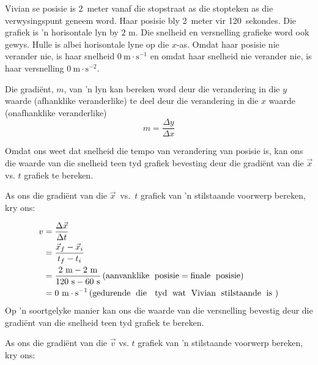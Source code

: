 Vivian se posisie is 2~meter vanaf die stopstraat as die stopteken as die verwysingspunt geneem word. Haar posisie bly 2~meter vir 120~sekondes. Die grafiek is  'n horisontale lyn by $2 \text{ m}$. Die snelheid en versnelling grafieke word ook gewys. Hulle is albei horisontale lyne op die $x$-as. Omdat haar posisie nie verander nie, is haar snelheid $0~\text{m}\ensuremath{\cdot}\text{s}{}^{-1}$ en omdat haar snelheid nie verander nie, is haar versnelling $0~\text{m}\ensuremath{\cdot}\text{s}{}^{-2}$.\par 


\par
{} {Die gradi\"ent, $m$, van  'n lyn kan bereken word deur die verandering in die $y$ waarde (afhanklike veranderlike) te deel deur die verandering in die $x$ waarde (onafhanklike veranderlike) $$m = \frac{\Delta y}{\Delta x}$$ \par  } 

Omdat ons weet dat snelheid die tempo van verandering van posisie is, kan ons die waarde van die snelheid teen tyd grafiek bevesting deur die gradi\"ent van die $\vec{x}$ vs. $t$ grafiek te bereken.\par 

	\par
As ons die gradi\"ent van die $\vec{x}$~vs.~$t$ grafiek van  'n stilstaande voorwerp bereken, kry ons:\par 
        \label{m38795*id69332}\nopagebreak\noindent{}
    \begin{align*}
	v &= \frac{\Delta \vec{x}}{\Delta t}\\
	&= \frac{\vec{x}_{f}-\vec{x}_{i}}{{t}_{f}-{t}_{i}}\\
	&= \frac{2~\text{m}-2~\text{m}}{120~\text{s}-60~\text{s}} \left(\text{aanvanklike\; posisie}=\text{finale\; posisie}\right)\\ 
	&= 0~\text{m}\ensuremath{\cdot}{\text{s}}^{-1}  \left(\text{gedurende\; die \; tyd\; wat\; Vivian\; stilstaande\; is}~\right) \\
      \end{align*}
Op  'n soortgelyke manier kan ons die waarde van die versnelling bevestig deur die gradi\"ent van die snelheid teen tyd grafiek te bereken.\par 

	\par
As ons die gradi\"ent van die $\vec{v}$ vs. $t$ grafiek van  'n stilstaande voorwerp bereken, kry ons:\par 
        \label{m38795*id69594}\nopagebreak\noindent{}
          
